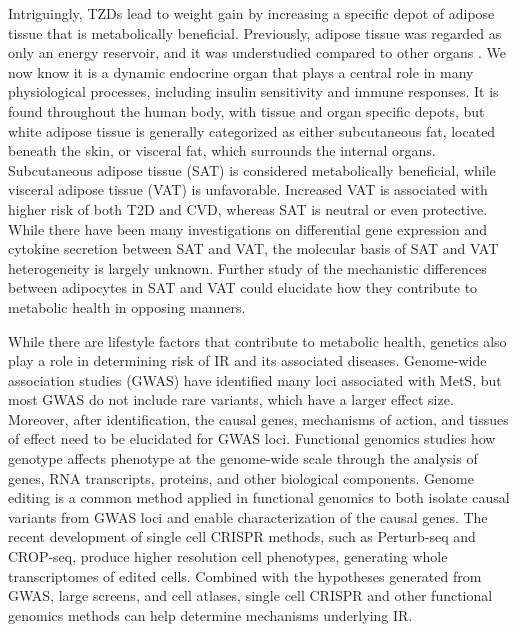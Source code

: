 \begin{dissertationintroduction}
Intriguingly, TZDs lead to weight gain by increasing a specific depot of adipose tissue that is metabolically beneficial\cite{Zhang2024-sl}. Previously, adipose tissue was regarded as only an energy reservoir, and it was understudied compared to other organs \cite{Sebo2019-nh}. We now know it is a dynamic endocrine organ that plays a central role in many physiological processes, including insulin sensitivity and immune responses\cite{Sakers2022-wb}. It is found throughout the human body, with tissue and organ specific depots, but white adipose tissue is generally categorized as either subcutaneous fat, located beneath the skin, or visceral fat, which surrounds the internal organs. Subcutaneous adipose tissue (SAT) is considered metabolically beneficial, while visceral adipose tissue (VAT) is unfavorable\cite{Mathur2022-fx}. Increased VAT is associated with higher risk of both T2D and CVD, whereas SAT is neutral or even protective\cite{Agrawal2023-ee}. While there have been many investigations on differential gene expression and cytokine secretion between SAT and VAT\cite{Mathur2022-fx,Ahn2019-us,Passaro2017-zk,Gesta2006-so,Tchkonia2007-xa,Wajchenberg2002-pt,Lee2010-fl}, the molecular basis of SAT and VAT heterogeneity is largely unknown. Further study of the mechanistic differences between adipocytes in SAT and VAT could elucidate how they contribute to metabolic health in opposing manners.   

While there are lifestyle factors that contribute to metabolic health, genetics also play a role in determining risk of IR and its associated diseases\cite{James2021-vu}. Genome-wide association studies (GWAS) have identified many loci associated with MetS\cite{Park2024-da}, but most GWAS do not include rare variants, which have a larger effect size\cite{Wang2021-au}. Moreover, after identification, the causal genes, mechanisms of action, and tissues of effect need to be elucidated for GWAS loci. Functional genomics studies how genotype affects phenotype at the genome-wide scale through the analysis of genes, RNA transcripts, proteins, and other biological components\cite{Farrell2017-lq}. Genome editing is a common method applied in functional genomics to both isolate causal variants from GWAS loci and enable characterization of the causal genes. The recent development of single cell CRISPR methods, such as Perturb-seq and CROP-seq, produce higher resolution cell phenotypes, generating whole transcriptomes of edited cells\cite{Datlinger2017-yc,Dixit2016-yg}. Combined with the hypotheses generated from GWAS, large screens, and cell atlases, single cell CRISPR and other functional genomics methods can help determine mechanisms underlying IR.   


\end{dissertationintroduction}
